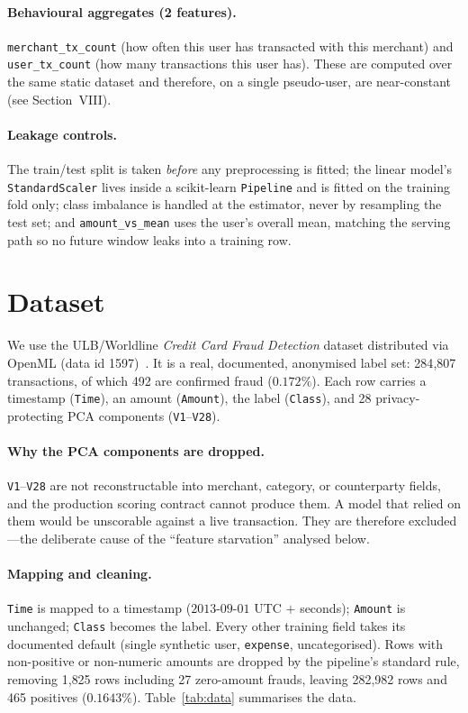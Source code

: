\documentclass[conference]{IEEEtran}
\begin{document}
\paragraph{Behavioural aggregates (2 features).}
\texttt{merchant\_tx\_count} (how often this user has transacted with this
merchant) and \texttt{user\_tx\_count} (how many transactions this user has).
These are computed over the same static dataset and therefore, on a single
pseudo-user, are near-constant (see Section~VIII).

\paragraph{Leakage controls.}
The train/test split is taken \emph{before} any preprocessing is fitted; the
linear model's \texttt{StandardScaler} lives inside a scikit-learn
\texttt{Pipeline} and is fitted on the training fold only; class imbalance is
handled at the estimator, never by resampling the test set; and
\texttt{amount\_vs\_mean} uses the user's overall mean, matching the serving
path so no future window leaks into a training row.

\section{Dataset}
We use the ULB/Worldline \emph{Credit Card Fraud Detection} dataset distributed
via OpenML (data id 1597)~\cite{vanschoren2014,dalpozzolo2015}. It is a real,
documented, anonymised label set: 284{,}807 transactions, of which 492 are
confirmed fraud ($0.172\%$). Each row carries a timestamp (\texttt{Time}), an
amount (\texttt{Amount}), the label (\texttt{Class}), and 28
privacy-protecting PCA components (\texttt{V1}--\texttt{V28}).

\paragraph{Why the PCA components are dropped.}
\texttt{V1}--\texttt{V28} are not reconstructable into merchant, category, or
counterparty fields, and the production scoring contract cannot produce them.
A model that relied on them would be unscorable against a live transaction.
They are therefore excluded---the deliberate cause of the ``feature
starvation'' analysed below.

\paragraph{Mapping and cleaning.}
\texttt{Time} is mapped to a timestamp ($2013\text{-}09\text{-}01$ UTC $+$
seconds); \texttt{Amount} is unchanged; \texttt{Class} becomes the label.
Every other training field takes its documented default (single synthetic
user, \texttt{expense}, uncategorised). Rows with non-positive or
non-numeric amounts are dropped by the pipeline's standard rule, removing
1{,}825 rows including 27 zero-amount frauds, leaving 282{,}982 rows and 465
positives ($0.1643\%$). Table~\ref{tab:data} summarises the data.
\end{document}
